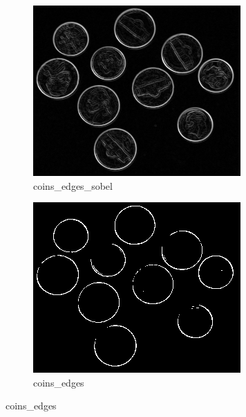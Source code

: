 \documentclass[bwprint]{gmcmthesis}
\numberwithin{figure}{section}
\begin{document}
\begin{figure}[h]
    \begin{subfigure}[b]{0.3\textwidth}
        \centering
        \includegraphics[width=\textwidth]{../output/coins_edges_sobel.png}
        \caption{coins\_edges\_sobel}
        \label{fig:subfigure9}
    \end{subfigure}
    \hfill
    \begin{subfigure}[b]{0.3\textwidth}
        \centering
        \includegraphics[width=\textwidth]{../output/coins_edges.png}
        \caption{coins\_edges}
        \label{fig:subfigure10}

\end{subfigure}
\end{figure}
\end{document}
